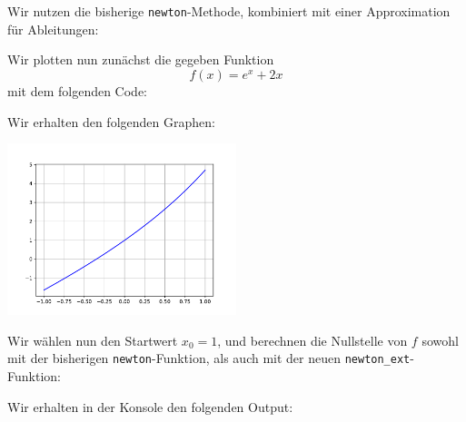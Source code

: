 \section{}

Wir nutzen die bisherige \texttt{newton}-Methode, kombiniert mit einer Approximation für Ableitungen:



Wir plotten nun zunächst die gegeben Funktion
\[
  f(x) = e^x + 2x
\]
mit dem folgenden Code:



Wir erhalten den folgenden Graphen:

\begin{center}
  \includegraphics[width = 0.5\textwidth]{chapter_04/exercise_04_14_figure.pdf}
\end{center}

Wir wählen nun den Startwert $x_0 = 1$, und berechnen die Nullstelle von $f$ sowohl mit der bisherigen \texttt{newton}-Funktion, als auch mit der neuen \texttt{newton\_ext}-Funktion:



Wir erhalten in der Konsole den folgenden Output:

